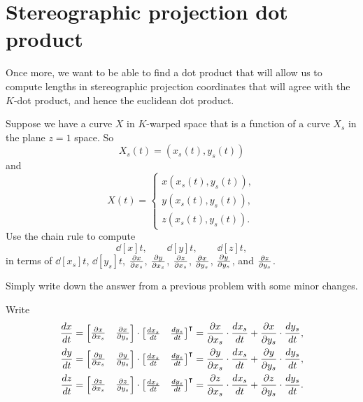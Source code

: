 \documentclass{ximera}
\begin{document}
\section{Stereographic projection dot product}

Once more, we want to be able to find a dot product that will allow us
to compute lengths in stereographic projection coordinates that will agree
with the $K$-dot product, and hence the euclidean dot product.

\begin{problem}
Suppose we have a curve $X$ in $K$-warped space that is a function of
a curve $X_s$ in the plane $z=1$ space. So
\[
X_s(t) = \left( x_s(t),y_s(t)\right)
\]
and
\[
X(t) = 
\begin{cases}
  x(x_s(t),y_s(t)),\\
  y(x_s(t),y_s(t)),\\
  z(x_s(t),y_s(t)).
\end{cases}
\]
Use the chain rule to compute
\[
\dd[x]{t}, \qquad \dd[y]{t}, \qquad \dd[z]{t},
\]
in terms of $\dd[x_s]{t}$, $\dd[y_s]{t}$, $\pp[x]{x_s}$,
$\pp[y]{x_s}$, $\pp[z]{x_s}$, $\pp[x]{y_s}$, $\pp[y]{y_s}$,
and $\pp[z]{y_s}$.
  \begin{hint}
  Simply write down the answer from a previous problem with some minor
  changes.
  \end{hint}
  \begin{freeResponse}
  Write
  \begin{align*}
    \dd[x]{t} &= \begin{bmatrix}\pp[x]{x_s} & \pp[x]{y_s}\end{bmatrix}\cdot\begin{bmatrix}\dd[x_s]{t} & \dd[y_s]{t}\end{bmatrix}^\transpose = \pp[x]{x_s}\cdot\dd[x_s]{t}+\pp[x]{y_s}\cdot\dd[y_s]{t},   \\
    \dd[y]{t} &= \begin{bmatrix}\pp[y]{x_s} & \pp[y]{y_s}\end{bmatrix}\cdot\begin{bmatrix}\dd[x_s]{t} & \dd[y_s]{t}\end{bmatrix}^\transpose = \pp[y]{x_s}\cdot\dd[x_s]{t}+\pp[y]{y_s}\cdot\dd[y_s]{t},   \\
    \dd[z]{t} &= \begin{bmatrix}\pp[z]{x_s} & \pp[z]{y_s}\end{bmatrix}\cdot\begin{bmatrix}\dd[x_s]{t} & \dd[y_s]{t}\end{bmatrix}^\transpose = \pp[z]{x_s}\cdot\dd[x_s]{t}+\pp[z]{y_s}\cdot\dd[y_s]{t}.  
  \end{align*}
\end{freeResponse}
\end{problem}
\end{document}
